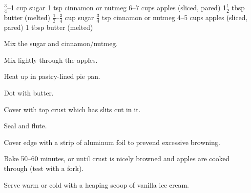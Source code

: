 \dishtype{\dessert}
\begin{ingreds}
        $\frac{3}{4}$--1 cup sugar
        1 tsp cinnamon or nutmeg
        6--7 cups apples (sliced, pared)
        1$\frac{1}{2}$ tbsp butter (melted)
        $\frac{1}{2}$--$\frac{3}{4}$ cup sugar
        $\frac{3}{4}$ tsp cinnamon or nutmeg
        4--5 cups apples (sliced, pared)
        1 tbsp butter (melted)
\end{ingreds}
\begin{method}
    Mix the sugar and cinnamon/nutmeg.\par
    Mix lightly through the apples.\par
    Heat up in pastry-lined pie pan.\par
    Dot with butter.\par
    Cover with top crust which has slits cut in it.\par
    Seal and flute.\par
    Cover edge with a strip of aluminum foil to prevend excessive browning.\par
    Bake 50--60 minutes, or until crust is nicely browned and apples are cooked through (test with a fork).\par
    Serve warm or cold with a heaping scoop of vanilla ice cream.    
\end{method}
